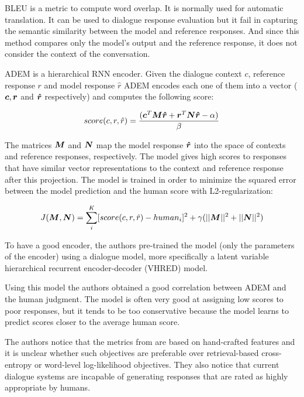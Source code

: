 \par BLEU is a metric to compute word overlap. It is normally used for automatic translation. It can be used to dialogue response evaluation but it fail in capturing the semantic similarity between the model and reference responses. And since this method compares only the model's output and the reference response, it does not consider the context of the conversation.

\par ADEM is a hierarchical RNN encoder. Given the dialogue context $c$, reference response $r$ and model response $\hat{r}$ ADEM encodes each one of them into a vector ($\bm{c}, \bm{r}$ and $\bm{\hat{r}}$ respectively) and computes the following score:

\begin{equation}
score(c,r,\hat{r}) = \frac{(\bm{c}^{T} \bm{M} \bm{\hat{r}} + \bm{r}^{T} \bm{N} \bm{\hat{r}} - \alpha)}{\beta}
\end{equation}

\par The matrices $\bm{M}$ and $\bm{N}$ map the model response $\bm{\hat{r}}$ into the space of contexts and reference responses, respectively. The model gives high scores to responses that have similar vector representations to the context and reference response after this projection. The model is trained in order to minimize the squared error between the model prediction and the human score with L2-regularization:

\begin{equation}
J(\bm{M}, \bm{N}) = \sum_{i}^{K}[score(c,r,\hat{r}) - human_{i}]^{2} + \gamma (||\bm{M}||^2 + ||\bm{N}||^2)
\end{equation}

\par To have a good encoder, the authors pre-trained the model (only the parameters of the encoder) using a dialogue model, more specifically a latent variable hierarchical recurrent encoder-decoder (VHRED) model.

\par Using this model the authors obtained a good correlation between ADEM and the human judgment. The model is often very good at assigning low scores to poor responses, but it tends to be too conservative because the model learns to predict scores closer to the average human score. 

\par The authors notice that the metrics from \cite{Li:2016} are based on hand-crafted features and it is unclear whether such objectives are preferable over retrieval-based cross-entropy or word-level log-likelihood objectives. They also notice that current dialogue  systems are incapable of generating responses that are rated as highly appropriate by humans.
